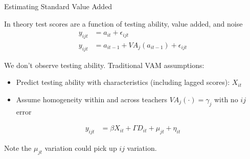 \documentclass[11pt]{beamer}
\newenvironment{wideitemize}{\itemize\addtolength{\itemsep}{14pt}}{\enditemize}
\begin{document}
\begin{frame}{Estimating Standard  Value Added}

\begin{wideitemize}
    \item In theory test scores are a function of testing ability, value added, and noise
    \begin{align*}
    y_{ijt}  &= a_{it} + \epsilon_{ijt} \\
    y_{ijt}  &= a_{it-1} + VA_j(a_{it-1}) + \epsilon_{ijt}
    \end{align*}
 
    \item We don't observe testing ability. Traditional VAM assumptions:
    \begin{itemize}
        \item Predict testing ability with characteristics (including lagged scores): $X_{it}$
        \item Assume homogeneity within and across teachers $VA_j(\cdot)=\gamma_j$ with no $ij$ error
    \end{itemize}
    \begin{align*}
    y_{ijt}  &= \beta X_{it} +\Gamma D_{it} +\mu_{jt} + \eta_{it}
    \end{align*}
    
    \item Note the $\mu_{jt}$ variation could pick up $ij$ variation.
       
    
\end{wideitemize}
\end{frame}


\end{document}

